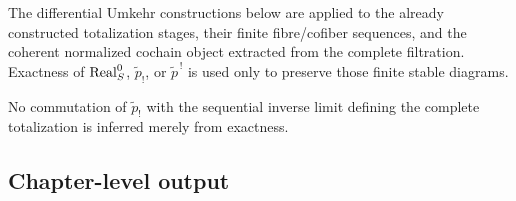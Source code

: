 \begin{convention}
\label{conv:monadic-de-rham-stagewise-exactness}
The differential Umkehr constructions below are applied to the already
constructed totalization stages, their finite fibre/cofiber sequences, and the
coherent normalized cochain object extracted from the complete filtration.
Exactness of \(\operatorname{Real}^{0}_S\), \(\widetilde p_!\), or
\(\widetilde p^{\,!}\) is used only to preserve those finite stable diagrams.

No commutation of \(\widetilde p_!\) with the sequential inverse limit defining
the complete totalization is inferred merely from exactness.
\end{convention}

\subsection{Chapter-level output}
\label{subsec:monadic-de-rham-output}

